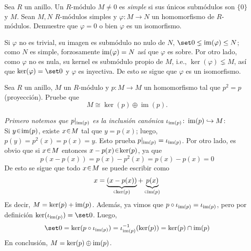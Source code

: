 \begin{ejer}
Sea $R$ un anillo. Un $R$-módulo $M \neq 0$ es \emph{simple} si sus únicos submódulos son $\{0\}$ y $M$. Sean $M, N$ $R$-módulos simples y $\varphi \colon M \to N$ un homomorfismo de $R$-módulos. Demuestre que $\varphi = 0$ o bien $\varphi$ es un isomorfismo.
\end{ejer}
\begin{sol}[Demostración]
Si $\varphi$ no es trivial, su imagen es submódulo no nulo de $N$, $\set0 \lneq \im(\varphi) \leq N$; como $N$ es simple, forzosamente $\operatorname{im}(\varphi) = N$ así que $\varphi$ es sobre. Por otro lado, como $\varphi$ no es nula, su kernel es submódulo propio de $M$, i.e., $\ker(\varphi) \lneq M$, así que $\ker(\varphi) = \set0$ y $\varphi$ es inyectiva. De esto se sigue que $\varphi$ es un isomorfismo.
\end{sol}

\begin{ejer}
Sea $R$ un anillo, $M$ un $R$-módulo y $p \colon M \to M$ un homomorfismo tal que $p^2 = p$ (proyección). Pruebe que
\[
M \cong \ker(p) \oplus \operatorname{im}(p).
\]
\end{ejer}
\begin{sol}[Demostración]
\emph{Primero notemos que $p|_{\operatorname{im}(p)}$ es la inclusión canónica $\iota_{\operatorname{im}(p)} \colon \operatorname{im}(p) \hookrightarrow M$}:\\ Si $y \en \im(p)$, existe $x \en M$ tal que $y = p(x)$; luego, $p(y) = p^2(x) = p(x) = y$. Esto prueba $p|_{\operatorname{im}(p)} = \iota_{\operatorname{im}(p)}$. Por otro lado, es obvio que si $x \en M$ entonces $x - p(x) \en \ker(p)$, ya que 
\[
p(x-p(x)) = p(x) - p^2(x) = p(x) - p(x) = 0 
\]
De esto se sigue que todo $x \en M$ se puede escribir como
\[
x = \underbrace{(x - p(x))}_{\en\ker(p)} + \underbrace{p(x)}_{\en\im(p)}
\]
Es decir, $M = \ker(p) + \operatorname{im}(p)$. Además, ya vimos que $p \circ \iota_{\operatorname{im}(p)} = \iota_{\operatorname{im}(p)}$, pero por definición $\ker(\iota_{\im(p)}) = \set0$. Luego,
\[
\set0 = \ker(p \circ \iota_{\im(p)}) = \iota_{\im(p)}^{-1}(\ker(p)) = \ker(p) \cap \im(p)
\]
En conclusión, $M = \ker(p) \oplus \operatorname{im}(p)$.
\end{sol}%

